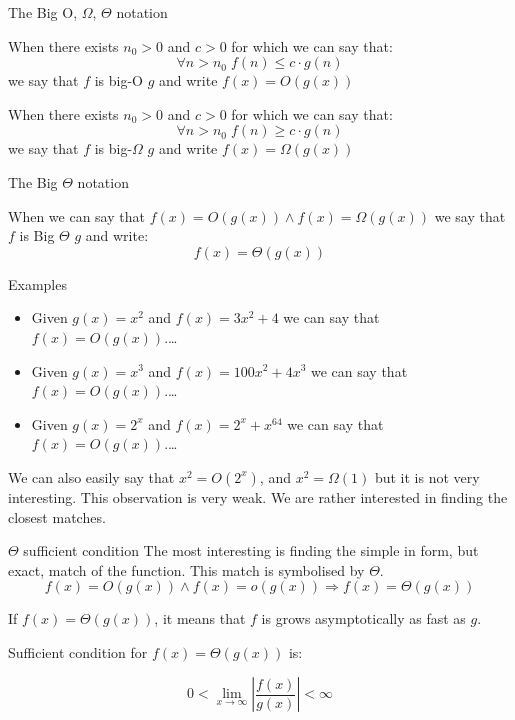 \documentclass{beamer}
\begin{document}
\begin{frame}{The Big O, $\Omega$, $\Theta$ notation}

When there exists $n_0>0$ and $c>0$ for which we can say that:
$$\forall{n>n_0} \; f(n) \leq c\cdot g(n) $$
we say that $f$ is big-O $g$ and write $f(x)=O(g(x))$

When there exists $n_0>0$ and $c>0$ for which we can say that:
$$\forall{n>n_0} \; f(n) \geq c\cdot g(n) $$
we say that $f$ is big-$\Omega$ $g$ and write $f(x)=\Omega(g(x))$


\end{frame}

\begin{frame}{The Big $\Theta$ notation}

When we can say that $f(x)=O(g(x)) \wedge f(x)=\Omega(g(x))$ we say that $f$ is Big $\Theta$ $g$ and write:
$$f(x)=\Theta(g(x))$$

\end{frame}


\begin{frame}{Examples}

\begin{itemize}
	\item Given $g(x)=x^2$ and $f(x)=3x^2+4$ we can say that $f(x)=O(g(x))$.\ldots
	\item Given $g(x)=x^3$ and $f(x)=100x^2+4x^3$ we can say that $f(x)=O(g(x))$.\ldots
    \item Given $g(x)=2^x$ and $f(x)=2^x+x^{64}$ we can say that $f(x)=O(g(x))$.\ldots
\end{itemize}
We can also easily say that $x^2=O(2^x)$, and $x^2=\Omega(1)$ but it is not very interesting. This observation is very weak. We are rather interested in finding the closest matches.

\end{frame}


\begin{frame}{$\Theta$ sufficient condition}
The most interesting is finding the simple in form, but exact, match of the function. This match is symbolised by $\Theta$. $$f(x)=O(g(x)) \wedge f(x)=o(g(x)) \Longrightarrow f(x)=\Theta(g(x))$$

If $f(x)=\Theta(g(x))$, it means that $f$ is grows asymptotically as fast as $g$.

Sufficient condition for $f(x)=\Theta(g(x))$ is:

$$0<\lim_{x\rightarrow\infty}\left\lvert\frac{f(x)}{g(x)}\right\rvert< \infty$$

\end{frame}
\end{document}
